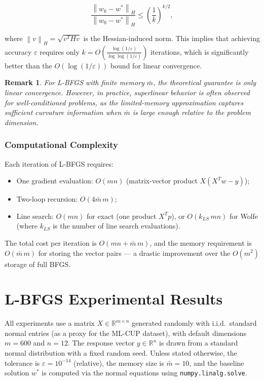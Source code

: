 \documentclass[11pt,a4paper]{article}
\newtheorem{remark}{Remark}
\newcommand{\R}{\mathbb{R}}
\newcommand{\norm}[1]{\left\|#1\right\|}
\begin{document}
\begin{equation}
    \frac{\norm{w_k - w^*}_H}{\norm{w_0 - w^*}_H} \leq \left(\frac{1}{k}\right)^{k/2},
\end{equation}

where $\norm{v}_H = \sqrt{v^T H v}$ is the Hessian-induced norm. This implies that 
achieving accuracy $\varepsilon$ requires only 
$k = O\!\left(\frac{\log(1/\varepsilon)}{\log\log(1/\varepsilon)}\right)$ iterations, 
which is significantly better than the $O(\log(1/\varepsilon))$ bound for linear convergence.

\begin{remark}
For L-BFGS with finite memory $\bar{m}$, the theoretical guarantee is only linear convergence. 
However, in practice, superlinear behavior is often observed for well-conditioned problems, 
as the limited-memory approximation captures sufficient curvature information when $\bar{m}$ 
is large enough relative to the problem dimension.
\end{remark}

\subsubsection{Computational Complexity}

Each iteration of L-BFGS requires:
\begin{itemize}[nosep]
    \item One gradient evaluation: $O(mn)$ (matrix-vector product $X(X^T w - y)$);
    \item Two-loop recursion: $O(4\bar{m}\,m)$;
    \item Line search: $O(mn)$ for exact (one product $X^T p$), or $O(k_{LS}\,mn)$ for Wolfe 
          (where $k_{LS}$ is the number of line search evaluations).
\end{itemize}

The total cost per iteration is $O(mn + \bar{m}\,m)$, and the memory requirement is 
$O(\bar{m}\,m)$ for storing the vector pairs --- a drastic improvement over the $O(m^2)$ 
storage of full BFGS.


\section{L-BFGS Experimental Results}
\label{sec:experiments}

All experiments use a matrix $X \in \R^{m \times n}$ generated randomly with i.i.d.\ standard 
normal entries (as a proxy for the ML-CUP dataset), with default dimensions $m = 600$ 
and $n = 12$. The response vector $y \in \R^n$ is drawn from a standard normal distribution 
with a fixed random seed. Unless stated otherwise, the tolerance is $\varepsilon = 10^{-14}$ 
(relative), the memory size is $\bar{m} = 10$, and the baseline solution $w^*$ is computed 
via the normal equations using \texttt{numpy.linalg.solve}.
\end{document}
